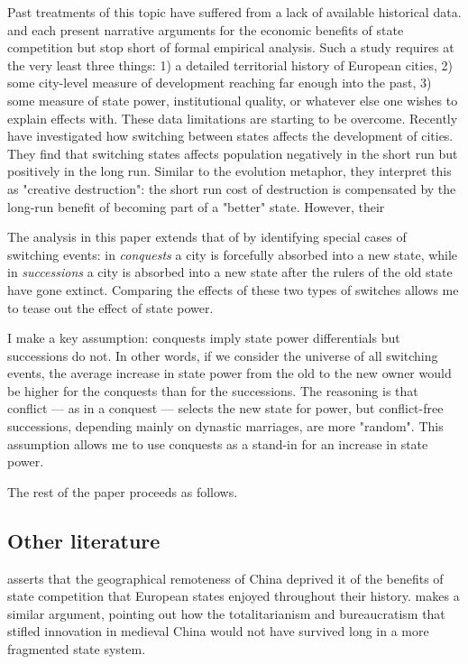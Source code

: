 \documentclass{article}
\begin{document}
Past treatments of this topic have suffered from a lack of available historical data. \cite{diamond1997} and \cite{landes2006} each present narrative arguments for the economic benefits of state competition but stop short of formal empirical analysis. Such a study requires at the very least three things: 1) a detailed territorial history of European cities, 2) some city-level measure of development reaching far enough into the past, 3) some measure of state power, institutional quality, or whatever else one wishes to explain effects with.
These data limitations are starting to be overcome. Recently \cite{schoenholzer2022} have investigated how switching between states affects the development of cities. They find that switching states affects population negatively in the short run but positively in the long run. Similar to the evolution metaphor, they interpret this as "creative destruction": the short run cost of destruction is compensated by the long-run benefit of becoming part of a "better" state. However, their 

The analysis in this paper extends that of \cite{schoenholzer2022} by identifying special cases of switching events: in \textit{conquests} a city is forcefully absorbed into a new state, while in \textit{successions} a city is absorbed into a new state after the rulers of the old state have gone extinct. Comparing the effects of these two types of switches allows me to tease out the effect of state power.

I make a key assumption: conquests imply state power differentials but successions do not. In other words, if we consider the universe of all switching events, the average increase in state power from the old to the new owner would be higher for the conquests than for the successions. The reasoning is that conflict --- as in a conquest --- selects the new state for power, but conflict-free successions, depending mainly on dynastic marriages, are more "random". This assumption allows me to use conquests as a stand-in for an increase in state power.

The rest of the paper proceeds as follows.

\subsection*{Other literature}

\cite{diamond1997} asserts that the geographical remoteness of China deprived it of the benefits of state competition that European states enjoyed throughout their history. \cite{landes2006} makes a similar argument, pointing out how the totalitarianism and bureaucratism that stifled innovation in medieval China would not have survived long in a more fragmented state system.
\end{document}
